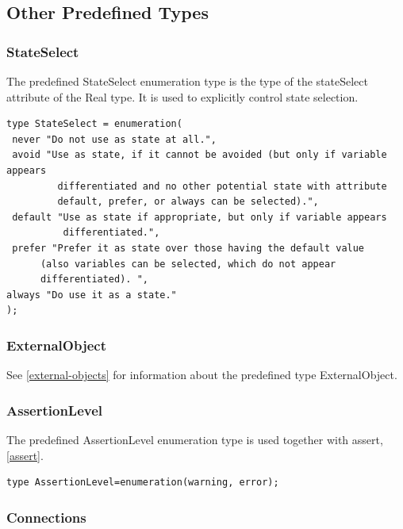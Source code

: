 \documentclass[10pt,a4paper]{report}
\def\doublelabel#1{\label{#1}\hypertarget{#1}{}}
\begin{document}
\subsection{Other Predefined Types}\doublelabel{other-predefined-types}

\subsubsection{StateSelect}\doublelabel{stateselect}

The predefined StateSelect enumeration type is the type of the
stateSelect attribute of the Real type. It is used to explicitly control
state selection.

\begin{lstlisting}[language=Modelica]
type StateSelect = enumeration(
 never "Do not use as state at all.",
 avoid "Use as state, if it cannot be avoided (but only if variable appears
         differentiated and no other potential state with attribute
         default, prefer, or always can be selected).",
 default "Use as state if appropriate, but only if variable appears
          differentiated.",
 prefer "Prefer it as state over those having the default value
      (also variables can be selected, which do not appear
      differentiated). ",
always "Do use it as a state."
);
\end{lstlisting}

\subsubsection{ExternalObject}\doublelabel{externalobject}

See \ref{external-objects} for information about the predefined type
ExternalObject.

\subsubsection{AssertionLevel}\doublelabel{assertionlevel}

The predefined AssertionLevel enumeration type is used together with
assert, \ref{assert}.
\begin{lstlisting}[language=Modelica]
type AssertionLevel=enumeration(warning, error);
\end{lstlisting}

\subsubsection{Connections}\doublelabel{connections}
\end{document}
